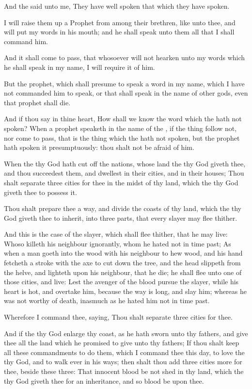 \Verse And the \LORD said unto me, They have well spoken that which they have spoken.

\Verse I will raise them up a Prophet from among their brethren, like unto thee, and will put my words in his mouth; and he shall speak unto them all that I shall command him.

\Verse And it shall come to pass, that whosoever will not hearken unto my words which he shall speak in my name, I will require it of him.

\Verse But the prophet, which shall presume to speak a word in my name, which I have not commanded him to speak, or that shall speak in the name of other gods, even that prophet shall die.

\Verse And if thou say in thine heart, How shall we know the word which the \LORD hath not spoken?  \Verse When a prophet speaketh in the name of the \LORD, if the thing follow not, nor come to pass, that is the thing which the \LORD hath not spoken, but the prophet hath spoken it presumptuously: thou shalt not be afraid of him.


\Chapter
\Verse When the \LORD thy God hath cut off the nations, whose land the \LORD thy God giveth thee, and thou succeedest them, and dwellest in their cities, and in their houses; \Verse Thou shalt separate three cities for thee in the midst of thy land, which the \LORD thy God giveth thee to possess it.

\Verse Thou shalt prepare thee a way, and divide the coasts of thy land, which the \LORD thy God giveth thee to inherit, into three parts, that every slayer may flee thither.

\Verse And this is the case of the slayer, which shall flee thither, that he may live: Whoso killeth his neighbour ignorantly, whom he hated not in time past; \Verse As when a man goeth into the wood with his neighbour to hew wood, and his hand fetcheth a stroke with the axe to cut down the tree, and the head slippeth from the helve, and lighteth upon his neighbour, that he die; he shall flee unto one of those cities, and live: \Verse Lest the avenger of the blood pursue the slayer, while his heart is hot, and overtake him, because the way is long, and slay him; whereas he was not worthy of death, inasmuch as he hated him not in time past.

\Verse Wherefore I command thee, saying, Thou shalt separate three cities for thee.

\Verse And if the \LORD thy God enlarge thy coast, as he hath sworn unto thy fathers, and give thee all the land which he promised to give unto thy fathers; \Verse If thou shalt keep all these commandments to do them, which I command thee this day, to love the \LORD thy God, and to walk ever in his ways; then shalt thou add three cities more for thee, beside these three: \Verse That innocent blood be not shed in thy land, which the \LORD thy God giveth thee for an inheritance, and so blood be upon thee.

